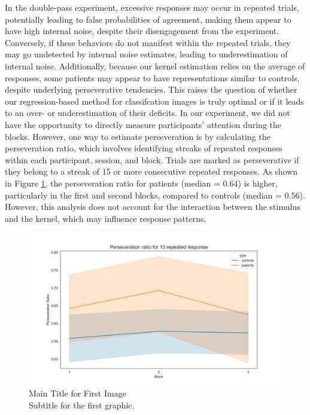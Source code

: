 In the double-pass experiment, excessive responses may occur in repeated trials, potentially leading to false probabilities of agreement, making them appear to have high internal noise, despite their disengagement from the experiment. Conversely, if these behaviors do not manifest within the repeated trials, they may go undetected by internal noise estimates, leading to underestimation of internal noise. Additionally, because our kernel estimation relies on the average of responses, some patients may appear to have representations similar to controls, despite underlying perseverative tendencies. This raises the question of whether our regression-based method for classifcation images is truly optimal or if it leads to an over- or underestimation of their deficits.
In our experiment, we did not have the opportunity to directly measure participants' attention during the blocks. However, one way to estimate perseveration is by calculating the perseveration ratio, which involves identifying streaks of repeated responses within each participant, session, and block. Trials are marked as perseverative if they belong to a streak of 15 or more consecutive repeated responses. As shown in Figure \ref{fig:perseveration_block}, the perseveration ratio for patients (median = 0.64) is higher, particularly in the first and second blocks, compared to controls (median = 0.56). However, this analysis does not account for the interaction between the stimulus and the kernel, which may influence response patterns.

\begin{figure}[H]
    \centering
    \includegraphics[width=15cm]{MainLayout/Images/chapter5/perseveration_block.jpg}
    \caption{Main Title for First Image \\ \small Subtitle for the first graphic.}
    \label{fig:perseveration_block}
\end{figure}


